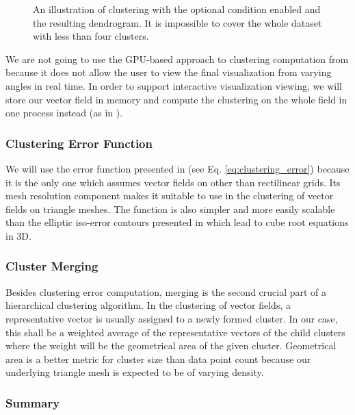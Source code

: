 \begin{figure}[h]
\centering
\def\svgwidth{\textwidth}

\caption[Forest Dendrogram]{An illustration of clustering with the optional condition enabled and the resulting dendrogram. It is impossible to cover the whole dataset with less than four clusters.}
\label{fig:forest_dendrogram}
\end{figure}

We are not going to use the GPU-based approach to clustering computation from \citet{Peng12} because it does not allow the user to view the final visualization from varying angles in real time. In order to support interactive visualization viewing, we will store our vector field in memory and compute the clustering on the whole field in one process instead (as in \citet{Telea99}).

\subsubsection{Clustering Error Function}

We will use the error function presented in \citet{Peng12} (see Eq. \ref{eq:clustering_error}) because it is the only one which assumes vector fields on other than rectilinear grids. Its mesh resolution component makes it suitable to use in the clustering of vector fields on triangle meshes. The function is also simpler and more easily scalable than the elliptic iso-error contours presented in \citet{Telea99} which lead to cube root equations in 3D.

\subsubsection{Cluster Merging}

Besides clustering error computation, merging is the second crucial part of a hierarchical clustering algorithm. In the clustering of vector fields, a representative vector is usually assigned to a newly formed cluster. In our case, this shall be a weighted average of the representative vectors of the child clusters where the weight will be the geometrical area of the given cluster. Geometrical area is a better metric for cluster size than data point count because our underlying triangle mesh is expected to be of varying density.

\subsubsection{Summary}

